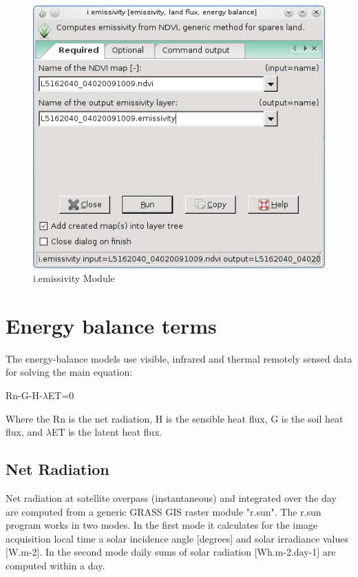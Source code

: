 \begin{figure}[htbp]
   \centering
   \includegraphics[scale=0.4]{gipe021.png}
   \caption{i.emissivity Module}
   \label{fig:gipe021}
\end{figure}


\section{Energy balance terms}
The energy-balance models use visible, infrared and thermal remotely sensed data for solving the main equation:\newline
\begin{center}
Rn-G-H-$\lambda$ET=0 \newline
\end{center}
Where the Rn is the net radiation, H is the sensible heat flux, G is the soil heat flux, and $\lambda$ET is the latent heat flux.\newline
\subsection{Net Radiation}
Net radiation at satellite overpass (instantaneous) and integrated over the day are computed from a generic GRASS GIS raster module "r.sun". 
The r.sun program works in two modes. In the first mode it calculates for the image acquisition local time a solar incidence angle [degrees] and solar irradiance values [W.m-2]. In the second mode daily sums of solar radiation [Wh.m-2.day-1] are computed within a day.\newline

